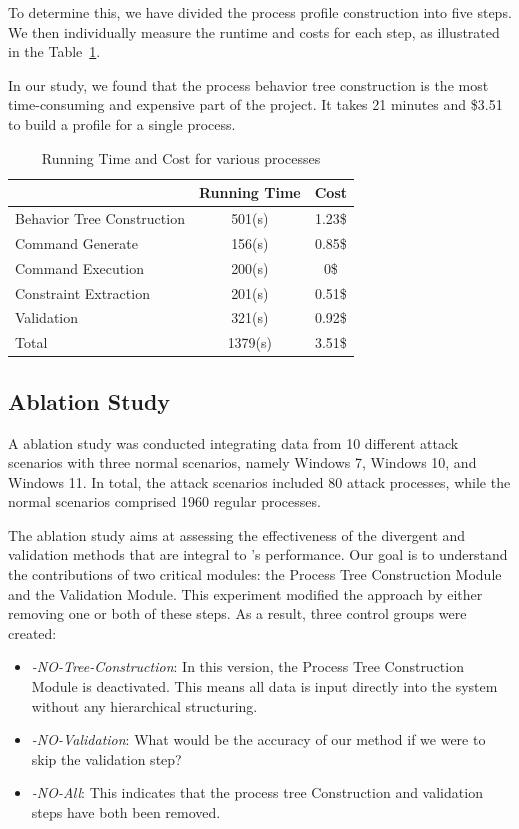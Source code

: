 To determine this, we have divided the process profile construction into five steps. We then individually measure the runtime and costs for each step, as illustrated in the Table~\ref{tab:process_metrics}.

In our study, we found that the process behavior tree construction is the most time-consuming and expensive part of the project. It takes 21 minutes and \$3.51 to build a profile for a single process.

\begin{table}[h!]
    \centering
    \begin{tabular}{|l|c|c|}
        \hline
        & Running Time & Cost \\
        \hline
        Behavior Tree Construction & 501(s) & 1.23\$ \\
        \hline
        Command Generate & 156(s) & 0.85\$ \\
        \hline
        Command Execution & 200(s) & 0\$ \\
        \hline
        Constraint Extraction & 201(s) & 0.51\$ \\
        \hline
        Validation & 321(s) & 0.92\$ \\
        \hline
        Total & 1379(s) & 3.51\$ \\
        \hline
    \end{tabular}
    \caption{Running Time and Cost for various processes}
    \label{tab:process_metrics}
\end{table}

\subsection{Ablation Study}
\label{sec-ab-study}
A ablation study was conducted integrating data from 10 different attack scenarios with three normal scenarios, namely Windows 7, Windows 10, and Windows 11. In total, the attack scenarios included 80 attack processes, while the normal scenarios comprised 1960 regular processes.

The ablation study aims at assessing the effectiveness of the divergent and validation methods that are integral to \tool's performance. Our goal is to understand the contributions of two critical modules: the Process Tree Construction Module and the Validation Module. 
This experiment modified the approach by either removing one or both of these steps. As a result, three control groups were created:
\begin{itemize}
\item \textit{\tool-NO-Tree-Construction}: In this version, the Process Tree Construction Module is deactivated. This means all data is input directly into the system without any hierarchical structuring.
\item \textit{\tool-NO-Validation}: What would be the accuracy of our method if we were to skip the validation step?
\item \textit{\tool-NO-All}: This indicates that the process tree Construction and validation steps have both been removed.
\end{itemize}

